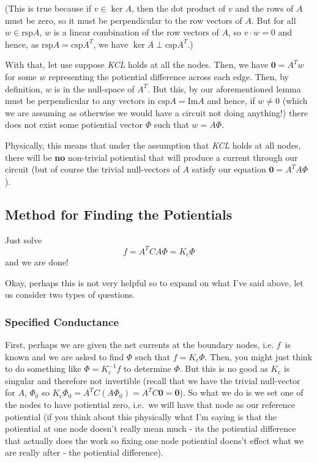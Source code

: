 \documentclass[]{article}
\begin{document}
(This is true because if \(v \in \ker A\), then the dot product of \(v\)
and the rows of \(A\) must be zero, so it must be perpendicular to the
row vectors of \(A\). But for all \(w \in \text{rsp} A\), \(w\) is a
linear combination of the row vectors of \(A\), so \(v \cdot w = 0\) and
hence, as \(\text{rsp} A = \text{csp} A^T\), we have
\(\ker A \perp \text{csp} A^T\).)

With that, let use suppose \emph{KCL} holds at all the nodes. Then, we
have \(\mathbf{0} = A^T w\) for some \(w\) representing the potiential
difference across each edge. Then, by definition, \(w\) is in the
null-space of \(A^T\). But this, by our aforementioned lemma must be
perpendicular to any vectors in \(\text{csp} A = \text{Im} A\) and
hence, if \(w \neq 0\) (which we are assuming as otherwise we would have
a circuit not doing anything!) there does not exist some potiential
vector \(\Phi\) such that \(w = A\Phi\).

Physically, this means that under the assumption that \emph{KCL} holds
at all nodes, there will be \textbf{no} non-trivial potiential that will
produce a current through our circuit (but of course the trivial
null-vectors of \(A\) satisfy our equation \(\mathbf{0} = A^T A \Phi\)).

\subsection{Method for Finding the
Potientials}\label{method-for-finding-the-potientials}

Just solve \[ f = A^T C A \Phi = K_c \Phi \] and we are done!

Okay, perhaps this is not very helpful so to expand on what I've said
above, let us consider two types of questions.

\subsubsection{Specified Conductance}\label{specified-conductance}

First, perhaps we are given the net currents at the boundary nodes, i.e.
\(f\)~is known and we are asked to find \(\Phi\) such that
\(f = K_c \Phi\). Then, you might just think to do something like
\(\Phi = K_c ^{-1} f\) to determine \(\Phi\). But this is no good as
\(K_c\) is singular and therefore not invertible (recall that we have
the trivial null-vector for \(A\), \(\Phi_0\) so
\(K_c \Phi_0 = A^T C (A\Phi_0) = A^T C \mathbf{0} = \mathbf{0}\)). So
what we do is we set one of the nodes to have potiential zero, i.e.~we
will have that node as our reference potiential (if you think about this
physically what I'm saying is that the potiential at one node doesn't
really mean much - its the potiential difference that actually does the
work so fixing one node potiential doens't effect what we are really
after - the potiential difference).
\end{document}
